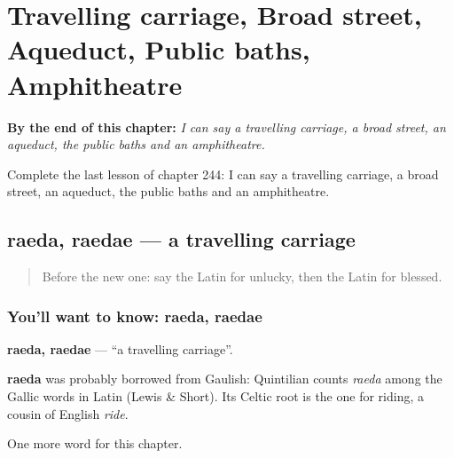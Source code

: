 
\chapter{Travelling carriage, Broad street, Aqueduct, Public baths, Amphitheatre}
\label{ch:la-travelling-carriage-broad-street-aqueduct-public-baths-amphitheatre}

\begin{chapteropening}
\textbf{By the end of this chapter:} \emph{I can say a travelling carriage, a broad street, an aqueduct, the public baths and an amphitheatre.}

Complete the last lesson of chapter 244: I can say a travelling carriage, a broad street, an aqueduct, the public baths and an amphitheatre.
\end{chapteropening}

\section[raeda, raedae]{raeda, raedae — a travelling carriage}

\label{lesson:LA-C244-raeda}



\begin{quote}
Before the new one: say the Latin for unlucky, then the Latin for blessed.
\end{quote}

\subsection*{You'll want to know: raeda, raedae}
\textbf{raeda, raedae} — \textquotedblleft{}a travelling carriage\textquotedblright{}.

\begin{cousinweb}
\textbf{raeda} was probably borrowed from Gaulish: Quintilian counts \emph{raeda} among the Gallic words in Latin (Lewis \& Short). Its Celtic root is the one for riding, a cousin of English \emph{ride}.
\end{cousinweb}

\begin{grammarlens}[title={What you've built}]
One more word for this chapter.
\end{grammarlens}

